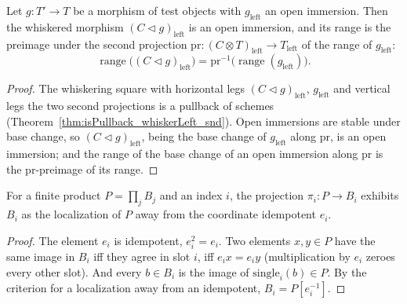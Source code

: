 \begin{lemma}
  \label{lem:range_whiskerLeft}
  \leanok
  Let \(g \colon T' \to T\) be a morphism of test objects with \(g_{\mathrm{left}}\) an open
  immersion. Then the whiskered morphism \((C \lhd g)_{\mathrm{left}}\) is an open immersion, and
  its range is the preimage under the second projection \(\mathrm{pr} \colon (C \otimes
  T)_{\mathrm{left}} \to T_{\mathrm{left}}\) of the range of \(g_{\mathrm{left}}\):
  \[
    \operatorname{range}\bigl((C \lhd g)_{\mathrm{left}}\bigr) = \mathrm{pr}^{-1}\bigl(
    \operatorname{range}(g_{\mathrm{left}})\bigr).
  \]
\end{lemma}
\begin{proof}
  \leanok
  The whiskering square with horizontal legs \((C \lhd g)_{\mathrm{left}}\), \(g_{\mathrm{left}}\)
  and vertical legs the two second projections is a pullback of schemes
  (Theorem~\ref{thm:isPullback_whiskerLeft_snd}). Open immersions are stable under base change, so
  \((C \lhd g)_{\mathrm{left}}\), being the base change of \(g_{\mathrm{left}}\) along
  \(\mathrm{pr}\), is an open immersion; and the range of the base change of an open immersion along
  \(\mathrm{pr}\) is the \(\mathrm{pr}\)-preimage of its range.
\end{proof}

\begin{lemma}
  \label{lem:isLocalization_away_piFactor}
  \leanok
  For a finite product \(P = \prod_j B_j\) and an index \(i\), the projection \(\pi_i \colon P \to
  B_i\) exhibits \(B_i\) as the localization of \(P\) away from the coordinate idempotent \(e_i\).
\end{lemma}
\begin{proof}
  \leanok
  The element \(e_i\) is idempotent, \(e_i^2 = e_i\). Two elements \(x, y \in P\) have the same
  image in \(B_i\) iff they agree in slot \(i\), iff \(e_i x = e_i y\) (multiplication by \(e_i\)
  zeroes every other slot). And every \(b \in B_i\) is the image of \(\mathrm{single}_i(b) \in P\).
  By the criterion for a localization away from an idempotent, \(B_i = P[e_i^{-1}]\).
\end{proof}

